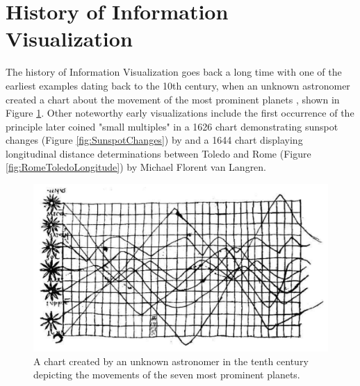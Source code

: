 \section{History of Information Visualization}

The history of Information Visualization goes back a long time with one of the earliest examples dating back to the 10th century, when an unknown astronomer created a chart about the movement of the most prominent planets \parencite{CommentariiInSomniumScipionis}, shown in Figure \ref{fig:PlanetaryMovements}. Other noteworthy early visualizations include the first occurrence of the principle \cite{VisualDisplayOfQuantitativeInformation} later coined "small multiples" in a 1626 chart demonstrating sunspot changes (Figure \ref{fig:SunspotChanges}) by \cite{RosaUrsina} and a 1644 chart displaying longitudinal distance determinations between Toledo and Rome (Figure \ref{fig:RomeToledoLongitude}) by Michael Florent van Langren. 

\begin{figure}[tp]
    \centering
    \includegraphics[keepaspectratio,width=\linewidth,height=\fullh / 3]
    {images/planetary-movements.png}
    \caption[Chart of Planetary Movements from the Tenth Century]{
        A chart created by an unknown astronomer in the tenth century depicting the movements of the seven most prominent planets. 
    }
    \label{fig:PlanetaryMovements}
\end{figure}

